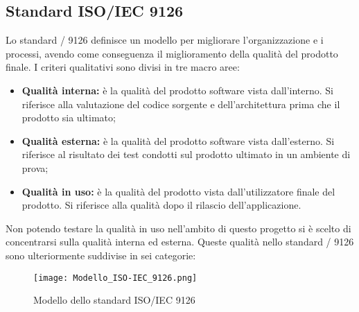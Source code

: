 \documentclass{scalatekids-article}
\begin{document}
\subsection{Standard ISO/IEC 9126}
\label{sec:ISO/IEC9126}
Lo standard / 9126 definisce un modello per migliorare l'organizzazione e i processi, avendo come conseguenza il miglioramento della qualità del prodotto finale. I criteri qualitativi sono divisi in tre macro aree:
\begin{itemize}
  \item{\textbf{Qualità interna:} è la qualità del prodotto software vista dall'interno. Si riferisce alla valutazione del codice sorgente e dell'architettura prima che il prodotto sia ultimato;}
  \item{\textbf{Qualità esterna:} è la qualità del prodotto software vista dall'esterno. Si riferisce al risultato dei test condotti sul prodotto ultimato in un ambiente di prova;}
  \item{\textbf{Qualità in uso:} è la qualità del prodotto vista dall'utilizzatore finale del prodotto. Si riferisce alla qualità dopo il rilascio dell'applicazione.}
\end{itemize}
Non potendo testare la qualità in uso nell'ambito di questo progetto si è scelto di concentrarsi sulla qualità interna ed esterna. Queste qualità nello standard / 9126 sono ulteriormente suddivise in sei categorie:
\begin{figure}[H]
  \begin{center}
    \texttt{[image: Modello\_ISO-IEC\_9126.png]}
    \caption{Modello dello standard ISO/IEC 9126}
  \end{center}
\end{figure}
\end{document}

